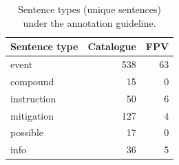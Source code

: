 \begin{table}[t]
\centering
\caption{Sentence types (unique sentences) under the annotation guideline.}
\label{tab:sentence_types}
\small
\begin{tabular}{lrr}
\toprule
Sentence type & Catalogue & FPV \\
\midrule
event & 538 & 63 \\
compound & 15 & 0 \\
instruction & 50 & 6 \\
mitigation & 127 & 4 \\
possible & 17 & 0 \\
info & 36 & 5 \\
\bottomrule
\end{tabular}
\end{table}